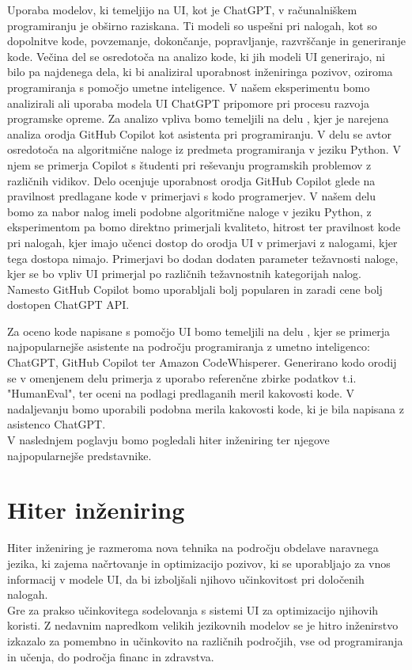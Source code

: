 \documentclass[a4paper,12pt,openright]{book}
\begin{document}
Uporaba modelov, ki temeljijo na UI, kot je ChatGPT, v računalniškem programiranju je obširno raziskana. Ti modeli so uspešni pri nalogah, kot so dopolnitve kode, povzemanje, dokončanje, popravljanje, razvrščanje in generiranje kode. \cite{rudolph2023war} Večina del se osredotoča na analizo kode, ki jih modeli UI generirajo, ni bilo pa najdenega dela, ki bi analiziral uporabnost inženiringa pozivov, oziroma programiranja s pomočjo umetne inteligence. V našem eksperimentu bomo analizirali ali uporaba modela UI ChatGPT pripomore pri procesu razvoja programske opreme.
\newline
Za analizo vpliva bomo temeljili na delu \cite{MORADIDAKHEL2023111734}, kjer je narejena analiza orodja GitHub Copilot kot asistenta pri programiranju. V delu se avtor osredotoča na algoritmične naloge iz predmeta programiranja v jeziku Python. V njem se primerja Copilot s študenti pri reševanju programskih problemov z različnih vidikov. Delo ocenjuje uporabnost orodja GitHub Copilot glede na pravilnost predlagane kode v primerjavi s kodo programerjev.
V našem delu bomo za nabor nalog imeli podobne algoritmične naloge v jeziku Python, z eksperimentom pa bomo direktno primerjali kvaliteto, hitrost ter pravilnost kode pri nalogah, kjer imajo učenci dostop do orodja UI v primerjavi z nalogami, kjer tega dostopa nimajo. Primerjavi bo dodan dodaten parameter težavnosti naloge, kjer se bo vpliv UI primerjal po različnih težavnostnih kategorijah nalog. Namesto GitHub Copilot bomo uporabljali bolj popularen in zaradi cene bolj dostopen ChatGPT API. 

Za oceno kode napisane s pomočjo UI bomo temeljili na delu \cite{yetistiren2023evaluating}, kjer se primerja najpopularnejše asistente na področju programiranja z umetno inteligenco: ChatGPT, GitHub Copilot ter Amazon CodeWhisperer. Generirano kodo orodij se v omenjenem delu primerja z uporabo referenčne zbirke podatkov t.i. "HumanEval", ter oceni na podlagi predlaganih meril kakovosti kode. V nadaljevanju bomo uporabili podobna merila kakovosti kode, ki je bila napisana z asistenco ChatGPT. \cite{7577432} \\
V naslednjem poglavju bomo pogledali hiter inženiring ter njegove najpopularnejše predstavnike.


\chapter{Hiter inženiring}

Hiter inženiring je razmeroma nova tehnika na področju obdelave naravnega jezika, ki zajema načrtovanje in optimizacijo pozivov, ki se uporabljajo za vnos informacij v modele UI, da bi izboljšali njihovo učinkovitost pri določenih nalogah. \cite{wang2024prompt} \\
Gre za prakso učinkovitega sodelovanja s sistemi UI za optimizacijo njihovih koristi. Z nedavnim napredkom velikih jezikovnih modelov se je hitro inženirstvo izkazalo za pomembno in učinkovito na različnih področjih, vse od programiranja in učenja, do področja financ in zdravstva. \cite{info:doi/10.2196/50638} \\
\end{document}
